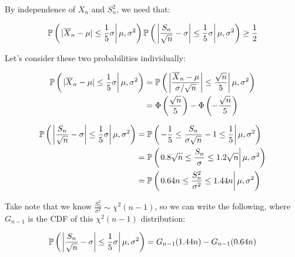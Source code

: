 \documentclass[a4paper]{article}
\begin{document}
                By independence of $\overline X_n$ and $S_n^2$, we need that:

                \[
                    \mathbb{P}\left(\left.|\overline X_n - \mu| \leq \frac{1}{5}
                    \sigma \right| \mu, \sigma^2\right)\mathbb{P}\left(\left.\left|
                    \frac{S_n}{\sqrt{n}} - \sigma\right| \leq \frac{1}{5}\sigma
                    \right|\mu, \sigma^2\right) \geq \frac{1}{2}
                \]

                Let's consider these two probabilities individually:

                \begin{align*}
                    \mathbb{P}\left(\left.|\overline X_n - \mu| \leq \frac{1}{5}
                        \sigma \right| \mu, \sigma^2\right) & = \mathbb{P}
                        \left(\left.\left|\frac{\overline X_n - \mu}
                        {\sigma/\sqrt{n}}\right| \leq \frac{\sqrt{n}}{5}\right|
                        \mu, \sigma^2\right) \\
                    & = \Phi\left(\frac{\sqrt{n}}{5}\right) - \Phi\left(-
                        \frac{\sqrt{n}}{5}\right)
                \end{align*}

                \begin{align*}
                    \mathbb{P}\left(\left.\left|\frac{S_n}{\sqrt{n}} - \sigma\right|
                        \leq \frac{1}{5}\sigma\right|\mu, \sigma^2\right) & =
                        \mathbb{P}\left(\left.-\frac{1}{5} \leq
                        \frac{S_n}{\sigma\sqrt{n}} - 1 \leq \frac{1}{5}
                        \right|\mu, \sigma^2\right) \\
                    & = \mathbb{P}\left(\left.0.8\sqrt{n} \leq \frac{S_n}{\sigma}
                        \leq 1.2\sqrt{n}\right|\mu, \sigma^2\right) \\
                    & = \mathbb{P}\left(\left.0.64n \leq \frac{S_n^2}{\sigma^2} \leq
                        1.44n\right|\mu, \sigma^2\right)
                \end{align*}

                Take note that we know $\frac{S_n^2}{\sigma^2} \sim \chi^2(n -
                1)$, so we can write the following, where $G_{n-1}$ is the CDF
                of this $\chi^2(n - 1)$ distribution:

                \[
                    \mathbb{P}\left(\left.\left|\frac{S_n}{\sqrt{n}} - \sigma\right|
                    \leq \frac{1}{5}\sigma\right|\mu, \sigma^2\right) =
                    G_{n-1}(1.44n) - G_{n-1}(0.64n)
                \]
\end{document}
